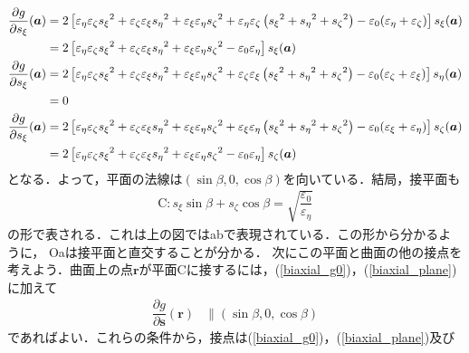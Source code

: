 \begin{align}
  \dfrac{\partial{g}}{\partial{}s_\xi}(\boldsymbol{a}) &= 2\left[\varepsilon_\eta\varepsilon_\zeta{s_\xi}^2+\varepsilon_\zeta\varepsilon_\xi{s_\eta}^2+\varepsilon_\xi\varepsilon_\eta{s_\zeta}^2+\varepsilon_\eta\varepsilon_\zeta\left({s_\xi}^2+{s_\eta}^2+{s_\zeta}^2\right)-\varepsilon_0(\varepsilon_\eta+\varepsilon_\zeta)\right]s_\xi(\boldsymbol{a})\notag\\
  &= 2\left[\varepsilon_\eta\varepsilon_\zeta{s_\xi}^2+\varepsilon_\zeta\varepsilon_\xi{s_\eta}^2+\varepsilon_\xi\varepsilon_\eta{s_\zeta}^2-\varepsilon_0\varepsilon_\eta\right]s_\xi(\boldsymbol{a})\\
  \dfrac{\partial{g}}{\partial{}s_\xi}(\boldsymbol{a}) &= 2\left[\varepsilon_\eta\varepsilon_\zeta{s_\xi}^2+\varepsilon_\zeta\varepsilon_\xi{s_\eta}^2+\varepsilon_\xi\varepsilon_\eta{s_\zeta}^2+\varepsilon_\zeta\varepsilon_\xi\left({s_\xi}^2+{s_\eta}^2+{s_\zeta}^2\right)-\varepsilon_0(\varepsilon_\zeta+\varepsilon_\xi)\right]s_\eta(\boldsymbol{a})\notag\\
  &= 0\\
  \dfrac{\partial{g}}{\partial{}s_\xi}(\boldsymbol{a}) &= 2\left[\varepsilon_\eta\varepsilon_\zeta{s_\xi}^2+\varepsilon_\zeta\varepsilon_\xi{s_\eta}^2+\varepsilon_\xi\varepsilon_\eta{s_\zeta}^2+\varepsilon_\xi\varepsilon_\eta\left({s_\xi}^2+{s_\eta}^2+{s_\zeta}^2\right)-\varepsilon_0(\varepsilon_\xi+\varepsilon_\eta)\right]s_\zeta(\boldsymbol{a})\notag\\
  &= 2\left[\varepsilon_\eta\varepsilon_\zeta{s_\xi}^2+\varepsilon_\zeta\varepsilon_\xi{s_\eta}^2+\varepsilon_\xi\varepsilon_\eta{s_\zeta}^2-\varepsilon_0\varepsilon_\eta\right]s_\zeta(\boldsymbol{a})
\end{align}
となる．よって，平面の法線は$(\sin\beta,0,\cos\beta)$を向いている．結局，接平面も
\begin{align}
  \text{C} \colon s_\xi\sin\beta+s_\zeta\cos\beta=\sqrt{\dfrac{\varepsilon_0}{\varepsilon_\eta}}\label{biaxial_plane}
\end{align}
の形で表される．これは上の図ではabで表現されている．この形から分かるように，
Oaは接平面と直交することが分かる．
次にこの平面と曲面の他の接点を考えよう．曲面上の点$\boldsymbol{r}$が平面Cに接するには，(\ref{biaxial_g0})，(\ref{biaxial_plane})に加えて
\begin{align}
  \dfrac{\partial{g}}{\partial\boldsymbol{s}}(\boldsymbol{r})&\parallel(\sin\beta,0,\cos\beta)
\end{align}
であればよい．これらの条件から，接点は(\ref{biaxial_g0})，(\ref{biaxial_plane})及び
